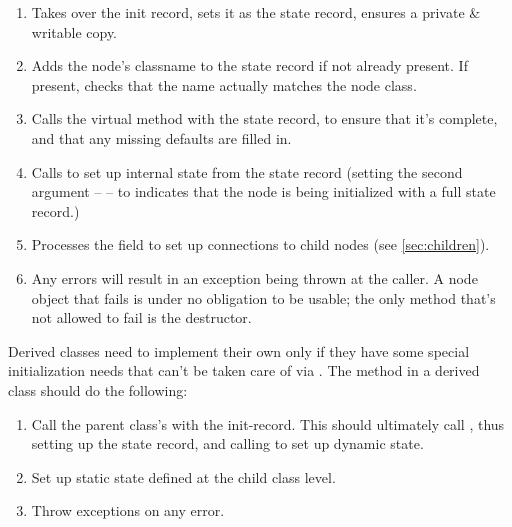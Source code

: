   \begin{enumerate}
  
  \item Takes over the init record,  sets it as the state record, ensures a
    private \& writable copy.
    
  \item Adds the node's classname to the state record if not already present.
    If present, checks that the name actually matches the node class.

  \item Calls the virtual  method with the state record,
    to ensure that it's complete, and that any missing defaults are filled in.

  \item Calls  to set up internal state from
    the state record (setting the second argument --  -- to
     indicates that the node is being initialized with a full
    state record.)

  \item Processes the  field to set up connections to child nodes
    (see \ref{sec:children}).

  \item Any errors will result in an exception being thrown at the caller. A
    node object that fails  is under no obligation to be usable; the
    only method that's not allowed to fail is the destructor.

  \end{enumerate}

  Derived classes need to implement their own  only if they have 
  some special initialization needs that can't be taken care of via
  . The  method in a derived class should do the
  following:

  \begin{enumerate}
  
  \item Call the parent class's  with the init-record. This should
    ultimately call , thus setting up the state record, and
    calling  to set up dynamic state.

  \item Set up static state defined at the child class level.

  \item Throw exceptions on any error. 

  \end{enumerate}
  
